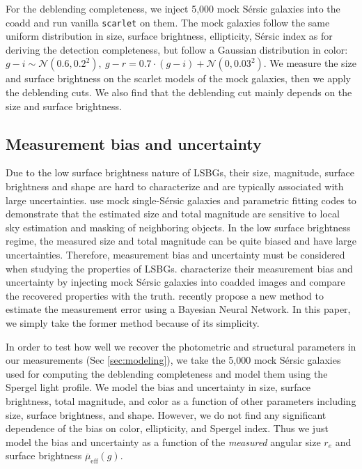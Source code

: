 \documentclass[twocolumn,astrosymb,twocolappendix]{aastex631}
\newcommand{\sbeff}{\overline{\mu}_{\mathrm{eff}}(g)}
\newcommand{\code}[1]{\texttt{#1}}
\newcommand{\sersic}{S\'ersic}
\begin{document}
\begin{CJK*}{UTF8}{gbsn}
For the deblending completeness, we inject 5,000 mock \sersic{} galaxies into the coadd and run vanilla \code{scarlet} on them. The mock galaxies follow the same uniform distribution in size, surface brightness, ellipticity, \sersic{} index as for deriving the detection completeness, but follow a Gaussian distribution in color: $g-i \sim \mathcal{N}(0.6, 0.2^2),\ g-r = 0.7 \cdot (g-i) + \mathcal{N}(0, 0.03^2)$. We measure the size and surface brightness on the scarlet models of the mock galaxies, then we apply the deblending cuts. We also find that the deblending cut mainly depends on the size and surface brightness. 

\subsection{Measurement bias and uncertainty}\label{sec:meas_unc}

Due to the low surface brightness nature of LSBGs, their size, magnitude, surface brightness and shape are hard to characterize and are typically associated with large uncertainties. \citet{Haussler2007} use mock single-\sersic{} galaxies and parametric fitting codes to demonstrate that the estimated size and total magnitude are sensitive to local sky estimation and masking of neighboring objects. In the low surface brightness regime, the measured size and total magnitude can be quite biased and have large uncertainties. Therefore, measurement bias and uncertainty must be considered when studying the properties of LSBGs. \citet{Zaritsky2021,Zaritsky2022} characterize their measurement bias and uncertainty by injecting mock \sersic{} galaxies into coadded images and compare the recovered properties with the truth. \citet{Tanoglidis2022ICML} recently propose a new method to estimate the measurement error using a Bayesian Neural Network. In this paper, we simply take the former method because of its simplicity. 

In order to test how well we recover the photometric and structural parameters in our measurements (Sec \ref{sec:modeling}), we take the 5,000 mock \sersic{} galaxies used for computing the deblending completeness and model them using the Spergel light profile. We model the bias and uncertainty in size, surface brightness, total magnitude, and color as a function of other parameters including size, surface brightness, and shape. However, we do not find any significant dependence of the bias on color, ellipticity, and Spergel index. Thus we just model the bias and uncertainty as a function of the \textit{measured} angular size $r_e$ and surface brightness $\sbeff$.


\end{CJK*}
\end{document}

